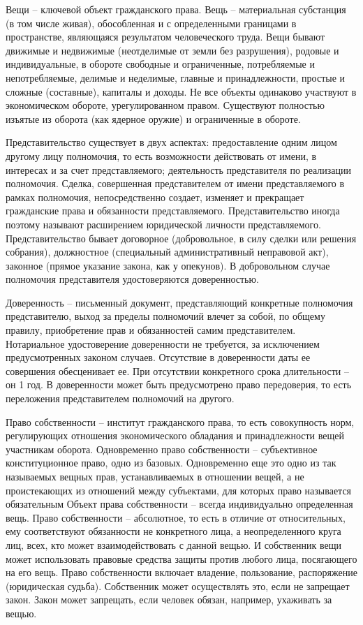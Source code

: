 \documentclass[a4paper, 12pt]{article}
\begin{document}
Вещи -- ключевой объект гражданского права. 
Вещь -- материальная субстанция (в том числе живая), обособленная и с определенными границами в пространстве, являющаяся результатом человеческого труда. 
Вещи бывают движимые и недвижимые (неотделимые от земли без разрушения), родовые и индивидуальные, в обороте свободные и ограниченные, потребляемые и непотребляемые, делимые и неделимые, главные и принадлежности, простые и сложные (составные), капиталы и доходы. 
Не все объекты одинаково участвуют в экономическом обороте, урегулированном правом. Существуют полностью изъятые из оборота (как ядерное оружие) и ограниченные в обороте. 

Представительство существует в двух аспектах: предоставление одним лицом другому лицу полномочия, то есть возможности действовать от имени, в интересах и за счет представляемого; деятельность представителя по реализации полномочия. 
Сделка, совершенная представителем от имени представляемого в рамках полномочия, непосредственно создает, изменяет и прекращает гражданские права и обязанности представляемого. 
Представительство иногда поэтому называют расширением юридической личности представляемого. 
Представительство бывает договорное (добровольное, в силу сделки или решения собрания), должностное (специальный административный неправовой акт), законное (прямое указание закона, как у опекунов). В добровольном случае полномочия представителя удостоверяются доверенностью. 

Доверенность -- письменный документ, представляющий конкретные полномочия представителю, выход за пределы полномочий влечет за собой, по общему правилу, приобретение прав и обязанностей самим представителем. 
Нотариальное удостоверение доверенности не требуется, за исключением предусмотренных законом случаев. 
Отсутствие в доверенности даты ее совершения обесценивает ее. 
При отсутствии конкретного срока длительности -- он 1 год. 
В доверенности может быть предусмотрено право передоверия, то есть переложения представителем полномочий на другого. 

Право собственности -- институт гражданского права, то есть совокупность норм, регулирующих отношения экономического обладания и принадлежности вещей участникам оборота. 
Одновременно право собственности -- субъективное конституционное право, одно из базовых. 
Одновременно еще это одно из так называемых вещных прав, устанавливаемых в отношении вещей, а не проистекающих из отношений между субъектами, для которых право называется обязательным 
Объект права собственности -- всегда индивидуально определенная вещь.
Право собственности -- абсолютное, то есть в отличие от относительных, ему соответствуют обязанности не конкретного лица, а неопределенного круга лиц, всех, кто может взаимодействовать с данной вещью. И собственник вещи может использовать правовые средства защиты против любого лица, посягающего на его вещь. 
Право собственности включает владение, пользование, распоряжение (юридическая судьба). Собственник может осуществлять это, если не запрещает закон. 
Закон может запрещать, если человек обязан, например, ухаживать за вещью. 
\end{document}
